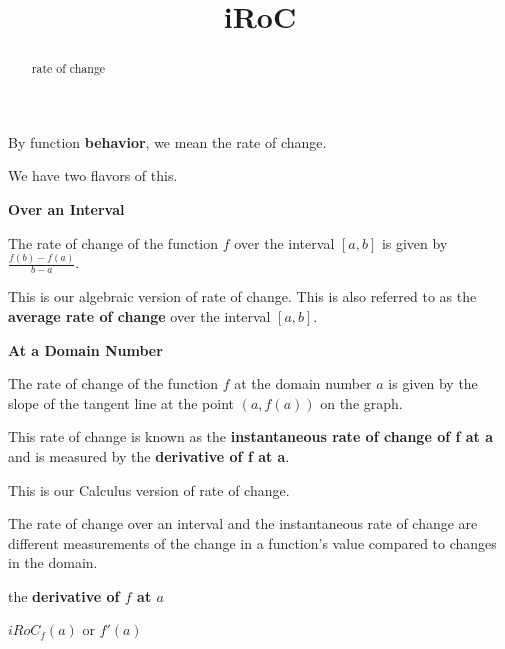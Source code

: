 \documentclass{ximera}
\title{iRoC}
\begin{document}
\begin{abstract}
rate of change
\end{abstract}
\maketitle




By function \textbf{behavior}, we mean the rate of change.


We have two flavors of this.




\begin{fact} \textbf{\textcolor{red!75!green}{Over an Interval}}    


The rate of change of the function $f$ over the interval $[a, b]$ is given by $\frac{f(b) - f(a)}{b - a}$. 


This is our algebraic version of rate of change. This is also referred to as the \textbf{average rate of change} over the interval $[a, b]$.


\end{fact}






\begin{fact} \textbf{\textcolor{red!75!green}{At a Domain Number}}   


The rate of change of the function $f$ at the domain number $a$ is given by the slope of the tangent line at the point $(a, f(a))$ on the graph. 


This rate of change is known as the \textbf{\textcolor{purple!85!blue}{instantaneous rate of change of f at a}} and is measured by the \textbf{\textcolor{blue!55!black}{derivative of f at a}}. 


This is our Calculus version of rate of change.


\end{fact}


The rate of change over an interval and the instantaneous rate of change are different measurements of the change in a function's value compared to changes in the domain. 




\begin{notation} the \textbf{\textcolor{red!50!green}{derivative of $f$ at $a$}}

\begin{center}
\textbf{\textcolor{blue!55!black}{$iRoC_f(a)$}} or \textbf{\textcolor{blue!55!black}{$f'(a)$}} 
\end{center}

\end{notation}
\end{document}
